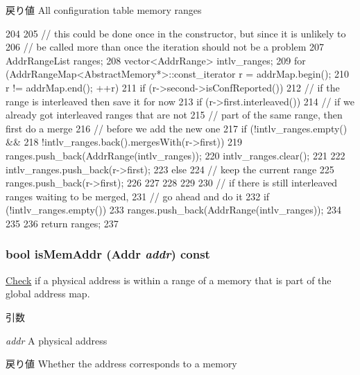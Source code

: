\begin{DoxyReturn}{戻り値}
All configuration table memory ranges 
\end{DoxyReturn}



\begin{DoxyCode}
204 {
205     // this could be done once in the constructor, but since it is unlikely to
206     // be called more than once the iteration should not be a problem
207     AddrRangeList ranges;
208     vector<AddrRange> intlv_ranges;
209     for (AddrRangeMap<AbstractMemory*>::const_iterator r = addrMap.begin();
210          r != addrMap.end(); ++r) {
211         if (r->second->isConfReported()) {
212             // if the range is interleaved then save it for now
213             if (r->first.interleaved()) {
214                 // if we already got interleaved ranges that are not
215                 // part of the same range, then first do a merge
216                 // before we add the new one
217                 if (!intlv_ranges.empty() &&
218                     !intlv_ranges.back().mergesWith(r->first)) {
219                     ranges.push_back(AddrRange(intlv_ranges));
220                     intlv_ranges.clear();
221                 }
222                 intlv_ranges.push_back(r->first);
223             } else {
224                 // keep the current range
225                 ranges.push_back(r->first);
226             }
227         }
228     }
229 
230     // if there is still interleaved ranges waiting to be merged,
231     // go ahead and do it
232     if (!intlv_ranges.empty()) {
233         ranges.push_back(AddrRange(intlv_ranges));
234     }
235 
236     return ranges;
237 }
\end{DoxyCode}
\hypertarget{classPhysicalMemory_a0faeadf06436f8123c7bda01087bb222}{
\subsubsection[{isMemAddr}]{\setlength{\rightskip}{0pt plus 5cm}bool isMemAddr ({\bf Addr} {\em addr}) const}}
\label{classPhysicalMemory_a0faeadf06436f8123c7bda01087bb222}
\hyperlink{classCheck}{Check} if a physical address is within a range of a memory that is part of the global address map.


\begin{DoxyParams}{引数}
\item[{\em addr}]A physical address \end{DoxyParams}
\begin{DoxyReturn}{戻り値}
Whether the address corresponds to a memory 
\end{DoxyReturn}



